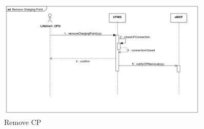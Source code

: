 \documentclass{Configuration_Files/PoliMi3i_thesis}
\begin{document}
\begin{figure}[H]
    \centering
    \includegraphics[width=0.9\textwidth]{Images/UseCases/RemoveCP.jpg}
    \caption{Remove CP}
\end{figure}

\end{document}
